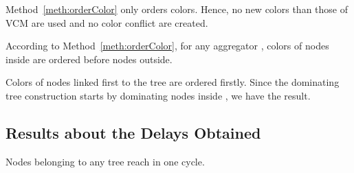 \begin{comment}
\subsection{Method of Associating Slots to Colors}
\begin{method}[Associating slots to colors]\label{meth:orderSlot}
Slots are associated to colors according to their decreasing order: earliest slots are occupied by highest colors.
\end{method}
\end{comment}

\begin{remark}
Method~\ref{meth:orderColor} only orders colors. Hence,  no new colors than those of VCM are used and no color conflict are created.
\end{remark}


















\begin{comment}
\begin{lemma}
For any two trees  and  rooted respectively at aggregators  and , the maximum number of colors used by this trees inside  and  respectively is the same.
\end{lemma}

\proof
The algorithm of dominating tree construction is the same for any aggregator.
Also, the features this algorithm uses are only relative to the symmetry of the grid. \tred{Consequently, the obtained trees are similar.}
Hence the lemma.
\endproof
\end{comment}

\begin{lemma}\label{lemma:insideFirst}
According to Method~\ref{meth:orderColor}, for any aggregator , colors of nodes inside  are ordered before nodes outside.
\end{lemma}
\proof
Colors of nodes linked first to the tree are ordered firstly. Since the dominating tree construction starts by dominating nodes inside , we have the result.
\endproof
\subsection{Results about the Delays Obtained}
\begin{theorem}\label{theo:treeNode}
Nodes belonging to any tree  reach  in one cycle.
\end{theorem}

